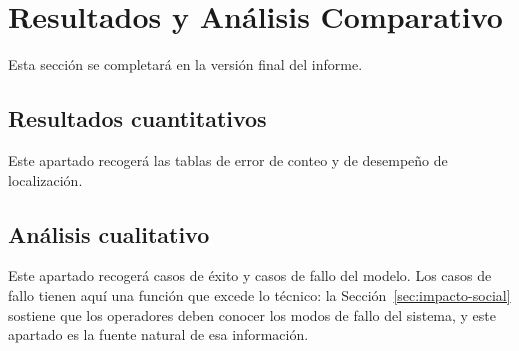 %
%
\section{Resultados y Análisis Comparativo}
\label{sec:resultados}

Esta sección se completará en la versión final del informe.

\subsection{Resultados cuantitativos}
\label{sec:resultados-cuant}

Este apartado recogerá las tablas de error de conteo y de desempeño de
localización.

\subsection{Análisis cualitativo}
\label{sec:resultados-cual}

Este apartado recogerá casos de éxito y casos de fallo del modelo. Los
casos de fallo tienen aquí una función que excede lo técnico: la
Sección~\ref{sec:impacto-social} sostiene que los operadores deben
conocer los modos de fallo del sistema, y este apartado es la fuente
natural de esa información.
